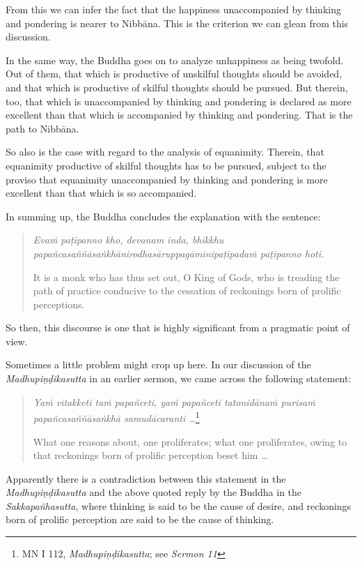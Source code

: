 From this we can infer the fact that the happiness unaccompanied by thinking and pondering is nearer to Nibbāna. This is the criterion we can glean from this discussion.

In the same way, the Buddha goes on to analyze unhappiness as being twofold. Out of them, that which is productive of unskilful thoughts should be avoided, and that which is productive of skilful thoughts should be pursued. But therein, too, that which is unaccompanied by thinking and pondering is declared as more excellent than that which is accompanied by thinking and pondering. That is the path to Nibbāna.

So also is the case with regard to the analysis of equanimity. Therein, that equanimity productive of skilful thoughts has to be pursued, subject to the proviso that equanimity unaccompanied by thinking and pondering is more excellent than that which is so accompanied.

In summing up, the Buddha concludes the explanation with the sentence:

\begin{quote}
\emph{Evaṁ paṭipanno kho, devanam inda, bhikkhu papañcasaññāsaṅkhānirodhasāruppagāminipaṭipadaṁ paṭipanno hoti.}

It is a monk who has thus set out, O King of Gods, who is treading the path of practice conducive to the cessation of reckonings born of prolific perceptions.
\end{quote}

So then, this discourse is one that is highly significant from a pragmatic point of view.

Sometimes a little problem might crop up here. In our discussion of the \emph{Madhupiṇḍikasutta} in an earlier sermon, we came across the following statement:

\begin{quote}
\emph{Yaṁ vitakketi taṁ papañceti, yaṁ papañceti tatonidānaṁ purisaṁ papañcasaññāsaṅkhā samudācaranti \ldots{}}\footnote{MN I 112, \emph{Madhupiṇḍikasutta}; see \emph{Sermon 11}}

What one reasons about, one proliferates; what one proliferates, owing to that reckonings born of prolific perception beset him \ldots{}
\end{quote}

Apparently there is a contradiction between this statement in the \emph{Madhupiṇḍikasutta} and the above quoted reply by the Buddha in the \emph{Sakkapañhasutta}, where thinking is said to be the cause of desire, and reckonings born of prolific perception are said to be the cause of thinking.

